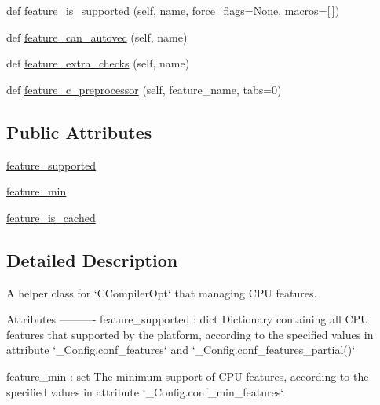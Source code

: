 \begin{DoxyCompactItemize}
\item 
def \hyperlink{classnumpy_1_1distutils_1_1ccompiler__opt_1_1__Feature_adab52af0dbdad47435ddb50cf1042283}{feature\+\_\+is\+\_\+supported} (self, name, force\+\_\+flags=None, macros=\mbox{[}$\,$\mbox{]})
\item 
def \hyperlink{classnumpy_1_1distutils_1_1ccompiler__opt_1_1__Feature_ab4e1bbbf998c1dc012f74d7cdb6bf68e}{feature\+\_\+can\+\_\+autovec} (self, name)
\item 
def \hyperlink{classnumpy_1_1distutils_1_1ccompiler__opt_1_1__Feature_ae5efa7e50ecf910ffd5fecaf31c56a6e}{feature\+\_\+extra\+\_\+checks} (self, name)
\item 
def \hyperlink{classnumpy_1_1distutils_1_1ccompiler__opt_1_1__Feature_a04f8d6305d8996f7b58060332c89b4ab}{feature\+\_\+c\+\_\+preprocessor} (self, feature\+\_\+name, tabs=0)
\end{DoxyCompactItemize}
\subsection*{Public Attributes}
\begin{DoxyCompactItemize}
\item 
\hyperlink{classnumpy_1_1distutils_1_1ccompiler__opt_1_1__Feature_a946a45ae9c021d04ef520d9787f518a5}{feature\+\_\+supported}
\item 
\hyperlink{classnumpy_1_1distutils_1_1ccompiler__opt_1_1__Feature_ad78fd220cdcd29f37e716fb9370c8c26}{feature\+\_\+min}
\item 
\hyperlink{classnumpy_1_1distutils_1_1ccompiler__opt_1_1__Feature_a722943b73603d5d9cae00a7bca16a556}{feature\+\_\+is\+\_\+cached}
\end{DoxyCompactItemize}


\subsection{Detailed Description}
\begin{DoxyVerb}A helper class for `CCompilerOpt` that managing CPU features.

Attributes
----------
feature_supported : dict
    Dictionary containing all CPU features that supported
    by the platform, according to the specified values in attribute
    `_Config.conf_features` and `_Config.conf_features_partial()`

feature_min : set
    The minimum support of CPU features, according to
    the specified values in attribute `_Config.conf_min_features`.
\end{DoxyVerb}
 

